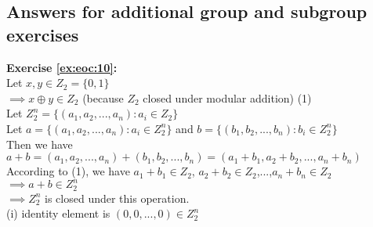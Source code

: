 \subsection{Answers for additional group and subgroup exercises}
\textbf{Exercise \ref{ex:eoc:10}:}\\
Let $x,y\in Z_2=\{0,1\}$\\
$\implies x\oplus y\in Z_2$ (because $Z_2$ closed under modular addition) (1)\\
Let $Z_2^n=\{(a_1,a_2,...,a_n):a_i\in Z_2\}$\\
Let $a=\{(a_1,a_2,...,a_n):a_i\in Z_2^n\}$ and $b=\{(b_1,b_2,...,b_n):b_i\in Z_2^n\}$\\
Then we have $a+b=(a_1,a_2,...,a_n)+(b_1,b_2,...,b_n)=(a_1+b_1,a_2+b_2,...,a_n+b_n)$\\
According to (1), we have $a_1+b_1\in Z_2$, $a_2+b_2\in Z_2$,...,$a_n+b_n\in Z_2$\\
$\implies a+b\in Z_2^n$\\
$\implies Z_2^n$ is closed under this operation.\\
(i) identity element is $(0,0,...,0)\in Z_2^n$\\
